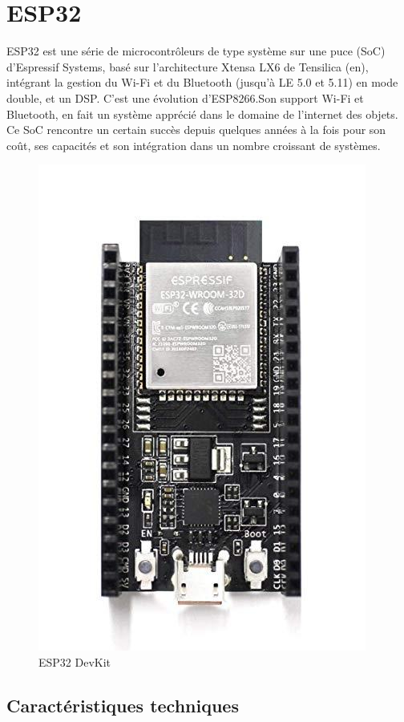 \section{ESP32}
ESP32 est une série de microcontrôleurs de type système sur une puce (SoC) 
d’Espressif Systems, basé sur l’architecture Xtensa LX6 de Tensilica (en), 
intégrant la gestion du Wi-Fi et du Bluetooth (jusqu’à LE 5.0 et 5.11) en mode 
double, et un DSP. C’est une évolution d’ESP8266.Son support Wi-Fi et Bluetooth, 
en fait un système apprécié dans le domaine de l’internet des objets. Ce SoC 
rencontre un certain succès depuis quelques années à la fois pour son coût, ses 
capacités et son intégration dans un nombre croissant de systèmes.\cite{32}

\begin{figure}[h!]
    \centering
    \includegraphics[scale=0.30]{images/esp32.jpg}
    \caption{ESP32 DevKit}
    \label{fig49}
\end{figure}

\subsection{Caractéristiques techniques}\cite{33}

